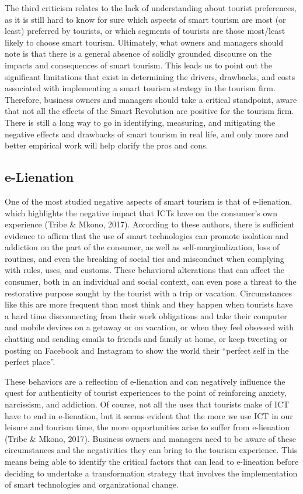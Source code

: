 \documentclass[
  letterpaper,
  DIV=11,
  numbers=noendperiod]{scrreprt}
\begin{document}
The third criticism relates to the lack of understanding about tourist
preferences, as it is still hard to know for sure which aspects of smart
tourism are most (or least) preferred by tourists, or which segments of
tourists are those most/least likely to choose smart tourism.
Ultimately, what owners and managers should note is that there is a
general absence of solidly grounded discourse on the impacts and
consequences of smart tourism. This leads us to point out the
significant limitations that exist in determining the drivers,
drawbacks, and costs associated with implementing a smart tourism
strategy in the tourism firm. Therefore, business owners and managers
should take a critical standpoint, aware that not all the effects of the
Smart Revolution are positive for the tourism firm. There is still a
long way to go in identifying, measuring, and mitigating the negative
effects and drawbacks of smart tourism in real life, and only more and
better empirical work will help clarify the pros and cons.

\hypertarget{e-lienation}{%
\subsection{e-Lienation}\label{e-lienation}}

One of the most studied negative aspects of smart tourism is that of
e-lienation, which highlights the negative impact that ICTs have on the
consumer's own experience (Tribe \& Mkono, 2017). According to these
authors, there is sufficient evidence to affirm that the use of smart
technologies can promote isolation and addiction on the part of the
consumer, as well as self-marginalization, loss of routines, and even
the breaking of social ties and misconduct when complying with rules,
uses, and customs. These behavioral alterations that can affect the
consumer, both in an individual and social context, can even pose a
threat to the restorative purpose sought by the tourist with a trip or
vacation. Circumstances like this are more frequent than most think and
they happen when tourists have a hard time disconnecting from their work
obligations and take their computer and mobile devices on a getaway or
on vacation, or when they feel obsessed with chatting and sending emails
to friends and family at home, or keep tweeting or posting on Facebook
and Instagram to show the world their ``perfect self in the perfect
place''.

These behaviors are a reflection of e-lienation and can negatively
influence the quest for authenticity of tourist experiences to the point
of reinforcing anxiety, narcissism, and addiction. Of course, not all
the uses that tourists make of ICT have to end in e-lienation, but it
seems evident that the more we use ICT in our leisure and tourism time,
the more opportunities arise to suffer from e-lienation (Tribe \& Mkono,
2017). Business owners and managers need to be aware of these
circumstances and the negativities they can bring to the tourism
experience. This means being able to identify the critical factors that
can lead to e-lineation before deciding to undertake a transformation
strategy that involves the implementation of smart technologies and
organizational change.
\end{document}
